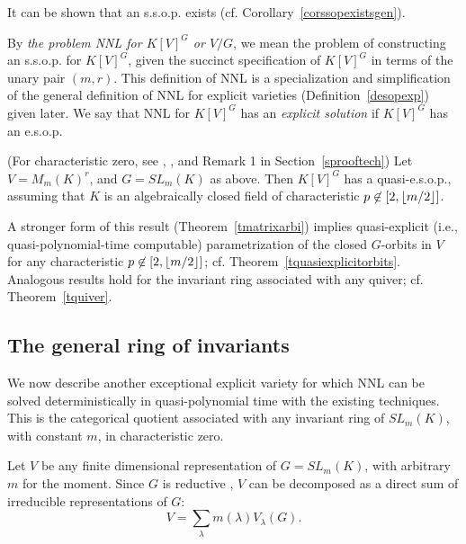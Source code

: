 \documentclass[11pt]{article}
\begin{document}
It can be shown that an  s.s.o.p. exists (cf. Corollary~\ref{corssopexistsgen}). 

By {\em the problem NNL for $K[V]^G$ or $V/G$}, we mean  the problem of constructing an 
s.s.o.p. for $K[V]^G$, given the succinct specification of
$K[V]^G$ in terms of the unary pair $(m,r)$. This definition of NNL is a specialization and simplification of the 
general definition of NNL for explicit varieties (Definition~\ref{desopexp}) given later. We say that  NNL 
for $K[V]^G$ has an {\em explicit solution}  if $K[V]^G$ has an e.s.o.p.


\begin{theorem} (For characteristic zero, 
see \cite{GCT5focs}, \cite{fs2,fs3}, and Remark 1 in Section~\ref{sprooftech}) \label{tmatrixNew} 
Let $V=M_m(K)^r$, and $G=SL_m(K)$ as above. Then
$K[V]^G$  has a quasi-e.s.o.p., assuming that 
$K$ is an algebraically closed field of characteristic $p \not \in [2,{\lfloor m/2 \rfloor}]$.
\end{theorem} 


A stronger form of this result  (Theorem~\ref{tmatrixarbi})  implies quasi-explicit
(i.e., quasi-polynomial-time computable)
parametrization of the closed $G$-orbits in $V$ 
for any characteristic $p \not \in [2,{\lfloor m/2 \rfloor}]$; cf. Theorem~\ref{tquasiexplicitorbits}. Analogous results 
hold for the invariant ring associated with any quiver; cf. Theorem~\ref{tquiver}.


\subsection{The general ring of invariants} \label{sgeneralintro}
We now describe another exceptional explicit variety for which NNL can be solved deterministically in quasi-polynomial time with the existing
techniques.
This is the categorical quotient
associated with any invariant ring of $SL_m(K)$, with constant $m$, in characteristic zero. 

Let $V$ be any   finite dimensional  representation  of $G=SL_m(K)$, with arbitrary
$m$ for the moment. 
Since $G$ is reductive \cite{fultonrepr}, $V$  can be decomposed as a direct sum of irreducible 
representations of $G$:
\begin{equation} \label{eqweyl0}
 V=\sum_\lambda m(\lambda) V_\lambda(G).
\end{equation}
\end{document}
